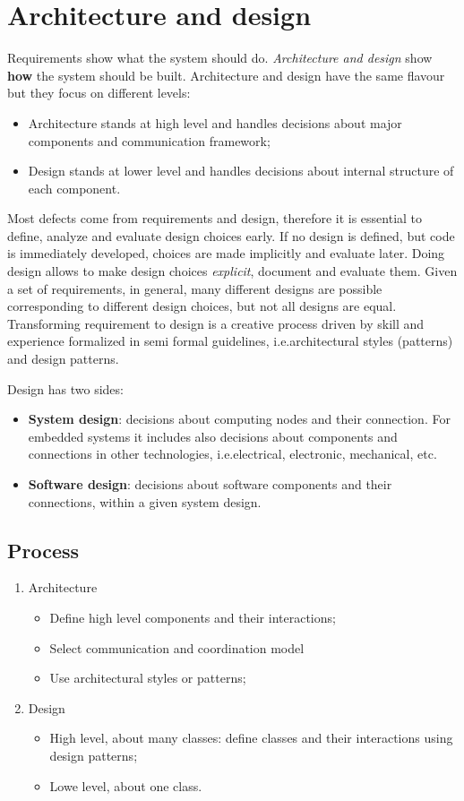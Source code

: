 \chapter{Architecture and design}
Requirements show what the system should do. \emph{Architecture and design} show \textbf{how} the system should be built. Architecture and design have the same flavour but they focus on different levels:
\begin{itemize}
\item Architecture stands at high level and handles decisions about major components and communication framework;
\item Design stands at lower level and handles decisions about internal structure of each component.
\end{itemize}
Most defects come from requirements and design, therefore it is essential to define, analyze and evaluate design choices early. If no design is defined, but code is immediately developed, choices are made implicitly and evaluate later. Doing design allows to make design choices \emph{explicit}, document and evaluate them. Given a set of requirements, in general, many different designs are possible corresponding to different design choices, but not all designs are equal. Transforming requirement to design is a creative process driven by skill and experience formalized in semi formal guidelines, i.e.\@ architectural styles (patterns) and design patterns.

Design has two sides:
\begin{itemize}
\item \textbf{System design}: decisions about computing nodes and their connection. For embedded systems it includes also decisions about components and connections in other technologies, i.e.\@ electrical, electronic, mechanical, etc.
\item \textbf{Software design}: decisions about software components and their connections, within a given system design.
\end{itemize}

\section{Process}
\begin{enumerate}
\item Architecture
\begin{itemize}
\item Define high level components and their interactions;
\item Select communication and coordination model
\item Use architectural styles or patterns;
\end{itemize}
\item Design
\begin{itemize}
\item High level, about many classes: define classes and their interactions using design patterns;
\item Lowe level, about one class.
\end{itemize}
\end{enumerate}

